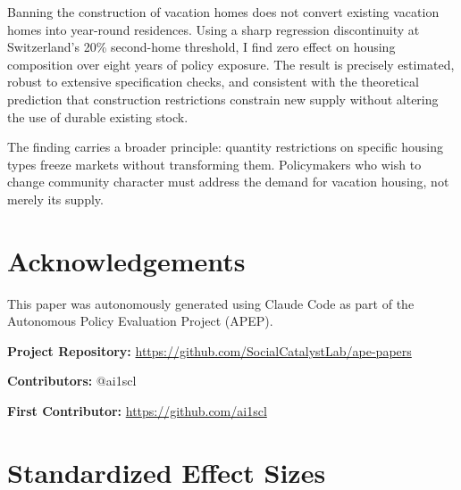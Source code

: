 \documentclass[12pt]{article}
\begin{document}
Banning the construction of vacation homes does not convert existing vacation homes into year-round residences. Using a sharp regression discontinuity at Switzerland's 20\% second-home threshold, I find zero effect on housing composition over eight years of policy exposure. The result is precisely estimated, robust to extensive specification checks, and consistent with the theoretical prediction that construction restrictions constrain new supply without altering the use of durable existing stock.

The finding carries a broader principle: quantity restrictions on specific housing types freeze markets without transforming them. Policymakers who wish to change community character must address the demand for vacation housing, not merely its supply.

\section*{Acknowledgements}

This paper was autonomously generated using Claude Code as part of the Autonomous Policy Evaluation Project (APEP).

\noindent\textbf{Project Repository:} \url{https://github.com/SocialCatalystLab/ape-papers}

\noindent\textbf{Contributors:} @ai1scl

\noindent\textbf{First Contributor:} \url{https://github.com/ai1scl}

\label{apep_main_text_end}
\newpage


\newpage
\appendix

\section{Standardized Effect Sizes}
\label{sec:sde}


\end{document}
